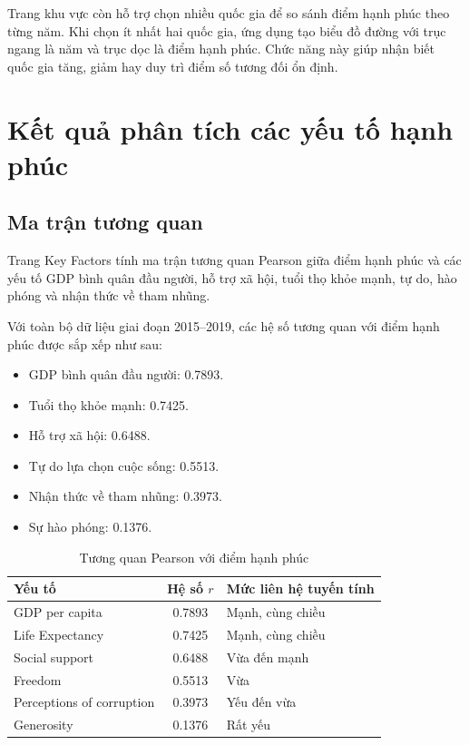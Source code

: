 Trang khu vực còn hỗ trợ chọn nhiều quốc gia để so sánh điểm hạnh phúc theo từng năm. Khi chọn ít nhất hai quốc gia, ứng dụng tạo biểu đồ đường với trục ngang là năm và trục dọc là điểm hạnh phúc. Chức năng này giúp nhận biết quốc gia tăng, giảm hay duy trì điểm số tương đối ổn định.

\section{Kết quả phân tích các yếu tố hạnh phúc}

\subsection{Ma trận tương quan}

Trang Key Factors tính ma trận tương quan Pearson giữa điểm hạnh phúc và các yếu tố GDP bình quân đầu người, hỗ trợ xã hội, tuổi thọ khỏe mạnh, tự do, hào phóng và nhận thức về tham nhũng.

Với toàn bộ dữ liệu giai đoạn 2015--2019, các hệ số tương quan với điểm hạnh phúc được sắp xếp như sau:

\begin{itemize}
    \item GDP bình quân đầu người: 0.7893.
    \item Tuổi thọ khỏe mạnh: 0.7425.
    \item Hỗ trợ xã hội: 0.6488.
    \item Tự do lựa chọn cuộc sống: 0.5513.
    \item Nhận thức về tham nhũng: 0.3973.
    \item Sự hào phóng: 0.1376.
\end{itemize}

\begin{table}[H]
\centering
\begin{tabular}{|p{6cm}|c|p{4cm}|}
\hline
\textbf{Yếu tố} & \textbf{Hệ số $r$} & \textbf{Mức liên hệ tuyến tính} \\
\hline
GDP per capita & 0.7893 & Mạnh, cùng chiều \\
\hline
Life Expectancy & 0.7425 & Mạnh, cùng chiều \\
\hline
Social support & 0.6488 & Vừa đến mạnh \\
\hline
Freedom & 0.5513 & Vừa \\
\hline
Perceptions of corruption & 0.3973 & Yếu đến vừa \\
\hline
Generosity & 0.1376 & Rất yếu \\
\hline
\end{tabular}
\caption{Tương quan Pearson với điểm hạnh phúc}
\label{tab:tuong-quan-yếu-to}
\end{table}

